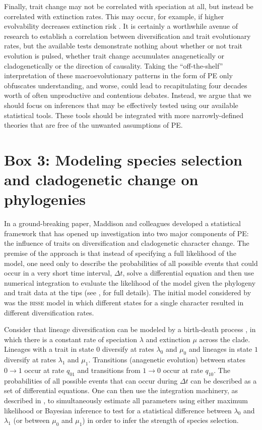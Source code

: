 Finally, trait change may not be correlated with speciation at all, but instead be correlated with extinction rates.  This may occur, for example, if higher evolvability decreases extinction risk \citep{Lanfear2010}. It is certainly a worthwhile avenue of research to establish a correlation between diversification and trait evolutionary rates, but the available tests demonstrate nothing about whether or not trait evolution is pulsed, whether trait change accumulates anagenetically or cladogenetically or the direction of causality. Taking the ``off-the-shelf'' interpretation of these macroevolutionary patterns in the form of PE only obfuscates understanding, and worse, could lead to recapitulating four decades worth of often unproductive and contentious debates. Instead, we argue that we should focus on inferences that may be effectively tested using our available statistical tools. These tools should be integrated with more narrowly-defined theories that are free of the unwanted assumptions of PE.  

\section{Box 3: Modeling species selection and cladogenetic change on phylogenies}

In a ground-breaking paper, Maddison and colleagues \citep{Maddison2007} developed a statistical framework that has opened up investigation into two major components of PE: the influence of traits on diversification \citep[``species selection'', \textit{sensu}][]{CoyneOrr, RaboskyMcCune2010} and cladogenetic character change. The premise of the approach is that instead of specifying a full likelihood of the model, one need only to describe the probabilities of all possible events that could occur in a very short time interval, $\Delta t$, solve a differential equation and then use numerical integration to evaluate the likelihood of the model given the phylogeny and trait data at the tips (see \citealt{Maddison2007}, for full details). The initial model considered by \citet{Maddison2007} was the \textsc{bisse} model in which different states for a single character resulted in different diversification rates.

Consider that lineage diversification can be modeled by a birth-death process \citep{Kendall1948}, in which there is a constant rate of speciation $\lambda$ and extinction $\mu$ across the clade. Lineages with a trait in state $0$ diversify at rates $\lambda_0$ and $\mu_0$ and lineages in state $1$ diversify at rates $\lambda_1$ and $\mu_1$. Transitions (anagenetic evolution) between states $0 \rightarrow 1$ occur at rate $q_{01}$ and transitions from $1 \rightarrow 0$ occur at rate $q_{10}$. The probabilities of all possible events that can occur during $\Delta t$ can be described as a set of differential equations. One can then use the integration machinery, as described in \citet{Maddison2007}, to simultaneously estimate all parameters using either maximum likelihood or Bayesian inference to test for a statistical difference between $\lambda_{0}$ and $\lambda_{1}$ (or between $\mu_0$ and $\mu_1$) in order to infer the strength of species selection.

